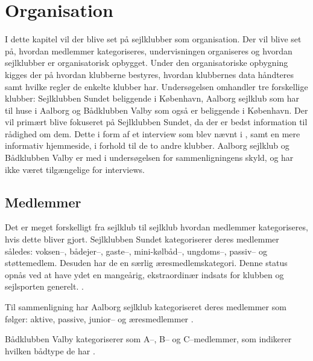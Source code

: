 \chapter{Organisation}\label{chap:organisation}

I dette kapitel vil der blive set på sejlklubber som organisation. Der vil blive set på, hvordan medlemmer
kategoriseres, undervisningen organiseres og hvordan sejlklubber er organisatorisk opbygget. Under den
organisatoriske opbygning kigges der på hvordan klubberne bestyres, hvordan klubbernes data håndteres samt
hvilke regler de enkelte klubber har. Undersøgelsen omhandler tre forskellige klubber: Sejlklubben Sundet
beliggende i København, Aalborg sejlklub  som har til huse i Aalborg
og Bådklubben Valby som også er beliggende i København. Der vil primært blive fokuseret på Sejlklubben Sundet,
da der er bedst information til rådighed om dem. Dette i form af et interview som blev nævnt i
, samt en mere informativ hjemmeside, i forhold til de to
andre klubber. Aalborg sejlklub og Bådklubben Valby er med i undersøgelsen for sammenligningens skyld, og har
ikke været tilgængelige for interviews.


\section{Medlemmer}\label{sec:organisation-medlemmer}

Det er meget forskelligt fra sejlklub til sejlklub hvordan medlemmer kategoriseres, hvis dette bliver gjort.
Sejlklubben Sundet kategoriserer deres medlemmer således: voksen--, bådejer--, gaste--, mini-kølbåd--,
ungdoms--, passiv-- og støttemedlem. Desuden har de en særlig æresmedlemskategori. Denne status opnås ved at
have ydet en mangeårig, ekstraordinær indsats for klubben og sejlsporten generelt. \citep{sundet_vedtaegter}.

Til sammenligning har Aalborg sejlklub kategoriseret deres medlemmer som følger: aktive, passive, junior-- og
æresmedlemmer \citep{aalborg_sejlklub_vedtaegter}.

Bådklubben Valby kategoriserer som A--, B-- og C--medlemmer, som indikerer hvilken bådtype de har
\citep{badklubben_valby_love}.

